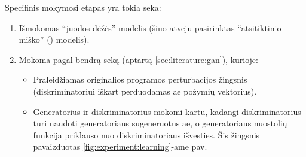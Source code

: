 Specifinis  mokymosi etapas yra tokia seka:
\begin{enumerate}
    \item Išmokomas \enquote{juodos dėžės} modelis (šiuo atveju pasirinktas
          \enquote{atsitiktinio miško} () modelis).
    \item Mokoma pagal bendrą seką (aptartą \ref{sec:literature:gan}), kurioje:
          \begin{itemize}
              \item Praleidžiamas originalios programos perturbacijos žingsnis (diskriminatoriui
                    iškart perduodamas \acs{ae} požymių vektorius).
              \item Generatorius ir diskriminatorius mokomi kartu, kadangi diskriminatorius turi
                    naudoti generatoriaus sugeneruotus \acs{ae}, o generatoriaus nuostolių funkcija
                    priklauso nuo diskriminatoriaus išvesties. Šis žingsnis pavaizduotas
                    \ref{fig:experiment:learning}-ame pav.
          \end{itemize}
\end{enumerate}

